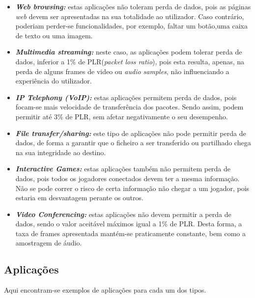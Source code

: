 \documentclass[a4paper, 11pt]{article}
\begin{document}
\begin{itemize}
    \item \textit{\textbf{Web browsing:}} estas aplicações não toleram perda de dados, pois as páginas \textit{web} devem ser apresentadas na sua totalidade ao utilizador. Caso contrário, poderiam perder-se funcionalidades, por exemplo, faltar um botão,uma caixa de texto ou uma imagem.
    
    \item \textit{\textbf{Multimedia streaming:}} neste caso, as aplicações podem tolerar perda de dados, inferior a 1\% de PLR(\textit{packet loss ratio}), pois esta resulta, apenas, na perda de alguns frames de video ou \textit{audio samples}, não influenciando a experiência do utilizador.
    
    \item \textit{\textbf{IP Telephony (VoIP):}} estas aplicações permitem perda de dados, pois focam-se mais velocidade de transferência dos pacotes. Sendo assim, podem permitir até 3\% de PLR, sem afetar negativamente o seu desempenho.
    
    \item \textit{\textbf{File transfer/sharing:}} este tipo de aplicações não pode permitir perda de dados, de forma a garantir que o ficheiro a ser transferido ou partilhado chega na sua integridade ao destino.
    
    \item \textit{\textbf{Interactive Games:}} estas aplicações também não permitem perda de dados, pois todos os jogadores conectados devem ter a mesma informação. Não se pode correr o risco de certa informação não chegar a um jogador, pois estaria em desvantagem perante os outros.
    
    \item \textit{\textbf{Video Conferencing:}} estas aplicações não devem permitir a perda de dados, sendo o valor aceitável máximos igual a 1\% de PLR. Desta forma, a taxa de frames apresentada mantém-se praticamente constante, bem como a amostragem de áudio.
\end{itemize}

\subsection{Aplicações}

Aqui encontram-se exemplos de aplicações para cada um dos tipos.
\end{document}
